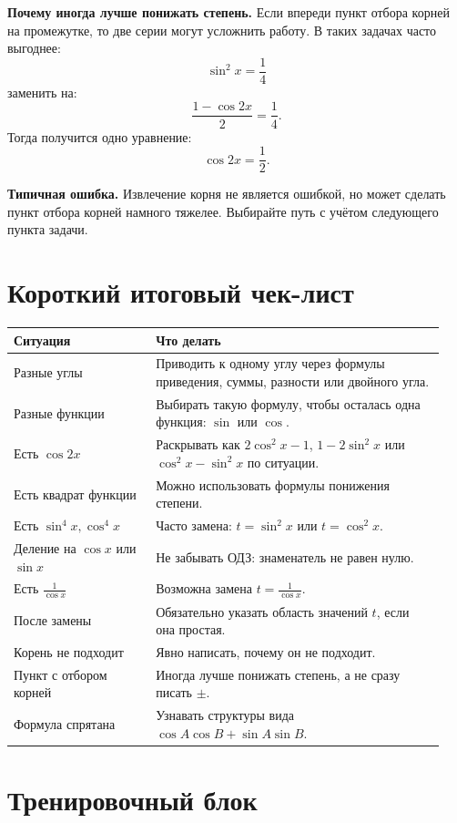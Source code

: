 \documentclass[a4paper,12pt]{article}
\newcommand{\sectionline}{\vspace{1mm}{\color{accent}\hrule height 0.6pt}\vspace{2mm}}
\newcommand{\important}[1]{\textcolor{darkaccent}{\textbf{#1}}}
\newcommand{\warning}[1]{\textcolor{warn}{\textbf{#1}}}
\begin{document}
\important{Почему иногда лучше понижать степень.}
Если впереди пункт отбора корней на промежутке, то две серии могут усложнить работу. В таких задачах часто выгоднее:
\[
\sin^2x=\frac14
\]
заменить на:
\[
\frac{1-\cos2x}{2}=\frac14.
\]
Тогда получится одно уравнение:
\[
\cos2x=\frac12.
\]

\warning{Типичная ошибка.}
Извлечение корня не является ошибкой, но может сделать пункт отбора корней намного тяжелее. Выбирайте путь с учётом следующего пункта задачи.

\section{Короткий итоговый чек-лист}
\sectionline

\begin{longtable}{p{0.31\linewidth}p{0.63\linewidth}}
\toprule
\textbf{Ситуация} & \textbf{Что делать} \\
\midrule
Разные углы & Приводить к одному углу через формулы приведения, суммы, разности или двойного угла. \\
Разные функции & Выбирать такую формулу, чтобы осталась одна функция: \(\sin\) или \(\cos\). \\
Есть \(\cos2x\) & Раскрывать как \(2\cos^2x-1\), \(1-2\sin^2x\) или \(\cos^2x-\sin^2x\) по ситуации. \\
Есть квадрат функции & Можно использовать формулы понижения степени. \\
Есть \(\sin^4x,\cos^4x\) & Часто замена: \(t=\sin^2x\) или \(t=\cos^2x\). \\
Деление на \(\cos x\) или \(\sin x\) & Не забывать ОДЗ: знаменатель не равен нулю. \\
Есть \(\frac1{\cos x}\) & Возможна замена \(t=\frac1{\cos x}\). \\
После замены & Обязательно указать область значений \(t\), если она простая. \\
Корень не подходит & Явно написать, почему он не подходит. \\
Пункт с отбором корней & Иногда лучше понижать степень, а не сразу писать \(\pm\). \\
Формула спрятана & Узнавать структуры вида \(\cos A\cos B+\sin A\sin B\). \\
\bottomrule
\end{longtable}

\newpage

\section{Тренировочный блок}
\sectionline
\end{document}
